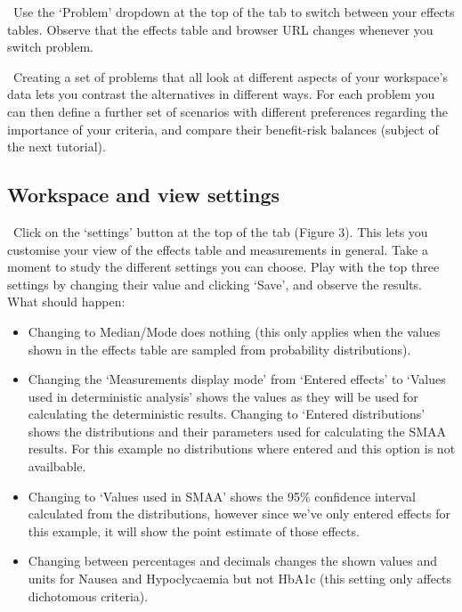 \documentclass[00_mcda_tutorial.tex]{subfiles}
\begin{document}
\noindent \leftpointright \, Use the ‘Problem’ dropdown at the top of the tab to switch between your effects tables. Observe that the effects table and browser URL changes whenever you switch problem.
\newline

\noindent \faGraduationCap \, Creating a set of problems that all look at different aspects of your workspace’s data lets you contrast the alternatives in different ways. For each problem you can then define a further set of scenarios with different preferences regarding the importance of your criteria, and compare their benefit-risk balances (subject of the next tutorial).

\subsection*{Workspace and view settings}

\noindent \leftpointright \, Click on the ‘settings’ button at the top of the tab (Figure 3). This lets you customise your view of the effects table and measurements in general. Take a moment to study the different settings you can choose. Play with the top three settings by changing their value and clicking ‘Save’, and observe the results. What should happen:

\begin{itemize}
    \item Changing to Median/Mode does nothing (this only applies when the values shown in the effects table are sampled from probability distributions).
    \item Changing the ‘Measurements display mode’ from ‘Entered effects’ to ‘Values used in deterministic analysis’ shows the values as they will be used for calculating the deterministic results.
          Changing to ‘Entered distributions’ shows the distributions and their parameters used for calculating the SMAA results. For this example no distributions where entered and this option is not availbable.
    \item Changing to ‘Values used in SMAA’ shows the 95\% confidence interval calculated from the distributions, however since we’ve only entered effects for this example, it will show the point estimate of those effects.
    \item Changing between percentages and decimals changes the shown values and units for Nausea and Hypoclycaemia but not HbA1c (this setting only affects dichotomous criteria).
\end{itemize}
\end{document}
